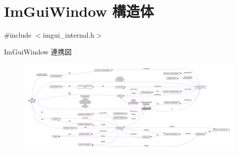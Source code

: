 \hypertarget{struct_im_gui_window}{}\section{Im\+Gui\+Window 構造体}
\label{struct_im_gui_window}


{\ttfamily \#include $<$imgui\+\_\+internal.\+h$>$}



Im\+Gui\+Window 連携図\nopagebreak
\begin{figure}[H]
\begin{center}
\leavevmode
\includegraphics[width=350pt]{struct_im_gui_window__coll__graph}
\end{center}
\end{figure}
